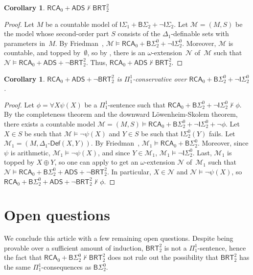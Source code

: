 \documentclass{article}
\def\M{\mathcal{M}}
\def\Nc{\mathcal{N}}
\newcommand{\ISig}{\mathsf{I}\Sigma^0}
\newcommand{\BSig}{\mathsf{B}\Sigma^0}
\newcommand{\RCA}[0]{\mathsf{RCA}}
\newcommand{\ADS}[0]{\mathsf{ADS}}
\newcommand{\BRT}[0]{\mathsf{BRT}}
\newcommand{\Definable}[2]{#1\mbox{-}\mathsf{Def}(#2)}
\numberwithin{theorem}{section}
\newtheorem{corollary}[theorem]{Corollary}
\begin{document}
\begin{corollary}
$\RCA_0 + \ADS \not \vdash \BRT_2^2$
\end{corollary}
\begin{proof}
Let $M$ be a countable model of $\mathsf{I}\Sigma_1  + \mathsf{B}\Sigma_2 +  \neg \mathsf{I}\Sigma_2$.
Let $\M = (M, S)$ be the model whose second-order part $S$ consists of the $\Delta_1$-definable sets with parameters in~$M$. By Friedman~\cite{friedman1976systems}, $\M \models \RCA_0 + \BSig_2 + \neg \ISig_2$. Moreover, $\M$ is countable, and topped by~$\emptyset$, so by , there is an $\omega$-extension~$\Nc$ of~$\M$ such that $\Nc \models \RCA_0 + \ADS + \neg \BRT^2_2$. Thus, $\RCA_0 + \ADS \not \vdash \BRT_2^2$.
\end{proof}

\begin{corollary}
$\RCA_0 + \ADS + \neg \BRT^2_2$ is $\Pi^1_1$-conservative over $\RCA_0 + \BSig_2 + \neg \ISig_2$.
\end{corollary}
\begin{proof}
Let $\phi = \forall X \psi(X)$ be a $\Pi^1_1$-sentence such that $\RCA_0 + \BSig_2 + \neg \ISig_2 \not \vdash \phi$.
By the completeness theorem and the downward Löwenheim-Skolem theorem, there exists a countable model $\M = (M, S) \models \RCA_0 + \BSig_2 + \neg \ISig_2 + \neg \phi$. Let $X \in S$ be such that $\M \models \neg \psi(X)$ and $Y \in S$ be such that $\ISig_2(Y)$ fails. Let $\M_1 =  (M, \Definable{\Delta_1}{X, Y})$. By Friedman~\cite{friedman1976systems}, $\M_1 \models \RCA_0 + \BSig_2$. Moreover, since $\psi$ is arithmetic, $\M_1 \models \neg \psi(X)$, and since $Y \in \M_1$, $\M_1 \models \neg \ISig_2$. Last, $\M_1$ is topped by $X \oplus Y$, so one can apply  to get an $\omega$-extension $\Nc$ of~$\M_1$ such that $\Nc \models \RCA_0 + \BSig_2 + \ADS + \neg \BRT^2_2$. In particular, $X \in \Nc$ and $\Nc \models \neg \psi(X)$, so $\RCA_0 + \BSig_2 + \ADS + \neg \BRT^2_2 \not \vdash \phi$.
\end{proof}

\section{Open questions}

We conclude this article with a few remaining open questions. Despite being provable over a sufficient amount of induction, $\BRT^2_2$ is not a $\Pi^1_1$-sentence, hence the fact that $\RCA_0 + \BSig_2 \not \vdash \BRT^2_2$ does not rule out the possibility that $\BRT^2_2$ has the same $\Pi^1_1$-consequences as $\BSig_2$.
\end{document}
